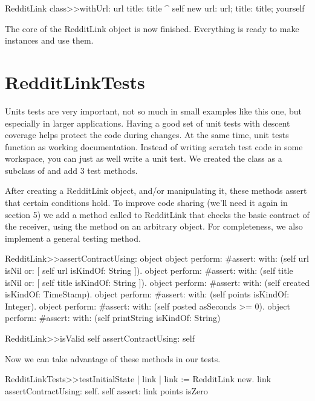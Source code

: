 \documentclass[a4paper,10pt,twoside]{book}
\begin{document}
\begin{code}{}
RedditLink class>>withUrl: url title: title
   ^ self new url: url; title: title; yourself
\end{code}

The core of the RedditLink object is now finished. Everything is ready to make instances and use them.


\section{RedditLinkTests}

Units tests are very important, not so much in small examples like this one, but especially in larger applications. Having a good set of unit tests with descent coverage helps protect the code during changes. At the same time, unit tests function as working documentation. Instead of writing scratch test code in some workspace, you can just as well write a unit test. We created the class  as a subclass of  and add 3 test methods.



After creating a RedditLink object, and/or manipulating it, these methods assert that certain conditions hold. To improve code sharing (we'll need it again in section 5) we add a method called  to RedditLink that checks the basic contract of the receiver, using the method  on an arbitrary object. For completeness, we also implement a general  testing method.


\begin{code}{}
RedditLink>>assertContractUsing: object
   object perform: #assert: with: (self url isNil or: [ self url isKindOf: String ]).
   object perform: #assert: with: (self title isNil or: [ self title isKindOf: String ]).
   object perform: #assert: with: (self created isKindOf: TimeStamp).
   object perform: #assert: with: (self points isKindOf: Integer).
   object perform: #assert: with: (self posted asSeconds >= 0).
   object perform: #assert: with: (self printString isKindOf: String)
   
RedditLink>>isValid
    self assertContractUsing: self
\end{code}

Now we can take advantage of these methods in our tests.

\begin{code}{}
RedditLinkTests>>testInitialState
    | link | 
    link := RedditLink new. 
    link assertContractUsing: self. 
    self assert: link points isZero
\end{code}
\end{document}
